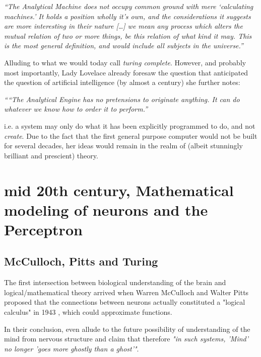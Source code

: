 \begin{center}
	\textit{“The Analytical Machine does not occupy common ground with mere ‘calculating machines.’ It holds a position wholly it's own, and the considerations it suggests are more interesting in their nature […] we mean any process which alters the mutual relation of two or more things, be this relation of what kind it may. This is the most general definition, and would include all subjects in the universe.”}
\end{center}

Alluding to what we would today call \textit{turing complete}. However, and probably most importantly, Lady Lovelace already foresaw the question that anticipated the question of artificial intelligence (by almost a century) she further notes:

\begin{center}
	\textit{““The Analytical Engine has no pretensions to originate anything. It can do whatever we know how to order it to perform.”}
\end{center}

i.e. a system may only do what it has been explicitly programmed to do, and not \textit{create}. Due to the fact that the first general purpose computer would not be built for several decades, her ideas would remain in the realm of (albeit stunningly brilliant and prescient) theory.

\section{mid 20th century, Mathematical modeling of neurons and the Perceptron}

\subsection{McCulloch, Pitts and Turing}

The first intersection between biological understanding of the brain and logical/mathematical theory arrived when Warren McCulloch and Walter Pitts proposed that the connections between neurons actually constituted a "logical calculus" in 1943 \cite{mcculloch1943logical}, which could approximate functions. 


In their conclusion, \cite{mcculloch1943logical} even allude to the future possibility of understanding of the mind from nervous structure and claim that therefore \textit{"in such systems, 'Mind' no longer 'goes more ghostly than a ghost'"}.

